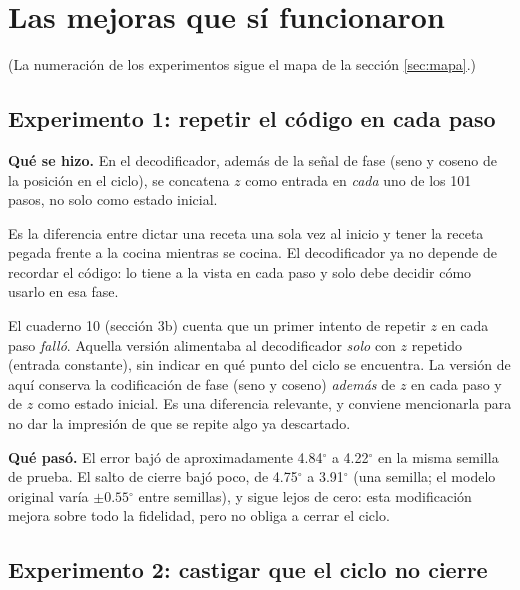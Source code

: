 \documentclass[11pt,a4paper]{article}
\newcommand{\gr}{$^\circ$}
\begin{document}
\section{Las mejoras que sí funcionaron}
\label{sec:mejoras}

(La numeración de los experimentos sigue el mapa de la sección \ref{sec:mapa}.)

\subsection{Experimento 1: repetir el código en cada paso}

\textbf{Qué se hizo.} En el decodificador, además de la señal de fase (seno y coseno de la posición en el ciclo), se concatena $z$ como entrada en \emph{cada} uno de los 101 pasos, no solo como estado inicial.

\begin{intuicion}
Es la diferencia entre dictar una receta una sola vez al inicio y tener la receta pegada frente a la cocina mientras se cocina. El decodificador ya no depende de recordar el código: lo tiene a la vista en cada paso y solo debe decidir cómo usarlo en esa fase.
\end{intuicion}

\begin{cuidado}
El cuaderno 10 (sección 3b) cuenta que un primer intento de repetir $z$ en cada paso \emph{falló}. Aquella versión alimentaba al decodificador \emph{solo} con $z$ repetido (entrada constante), sin indicar en qué punto del ciclo se encuentra. La versión de aquí conserva la codificación de fase (seno y coseno) \emph{además} de $z$ en cada paso y de $z$ como estado inicial. Es una diferencia relevante, y conviene mencionarla para no dar la impresión de que se repite algo ya descartado.
\end{cuidado}

\textbf{Qué pasó.} El error bajó de aproximadamente 4.84\gr{} a 4.22\gr{} en la misma semilla de prueba. El salto de cierre bajó poco, de 4.75\gr{} a 3.91\gr{} (una semilla; el modelo original varía $\pm0.55$\gr{} entre semillas), y sigue lejos de cero: esta modificación mejora sobre todo la fidelidad, pero no obliga a cerrar el ciclo.

\subsection{Experimento 2: castigar que el ciclo no cierre}
\end{document}
